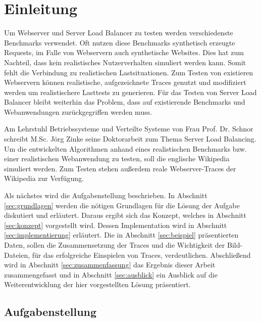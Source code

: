 \section{Einleitung}
\label{sec:einleitung}

Um Webserver und Server Load Balancer zu testen werden verschiedenste Benchmarks verwendet. Oft nutzen diese Benchmarks synthetisch erzeugte Requests, im Falle von Webservern auch synthetische Websites. Dies hat zum Nachteil, dass kein realistisches Nutzerverhalten simuliert werden kann. Somit fehlt die Verbindung zu realistischen Lastsituationen. Zum Testen von existieren Webservern können realistische, aufgezeichnete Traces genutzt und modifiziert werden um realistischere Lasttests zu generieren. Für das Testen von Server Load Balancer bleibt weiterhin das Problem, dass auf existierende Benchmarks und Webanwendungen zurückgegriffen werden muss. 

Am Lehrstuhl Betriebssysteme und Verteilte Systeme von Frau Prof. Dr. Schnor
schreibt M.Sc. Jörg Zinke seine Doktorarbeit zum Thema Server Load Balancing. Um die entwickelten Algorithmen anhand eines realistischen Benchmarks bzw. einer realistischen Webanwendung zu testen, soll die englische Wikipedia simuliert werden. Zum Testen stehen außerdem reale Webserver-Traces der Wikipedia zur Verfügung.

Als nächstes wird die Aufgabenstellung beschrieben. In Abschnitt \ref{sec:grundlagen} werden die nötigen Grundlagen für die Lösung der Aufgabe diskutiert und erläutert. Daraus ergibt sich das Konzept, welches in Abschnitt \ref{sec:konzept} vorgestellt wird. Dessen Implementation wird in Abschnitt \ref{sec:implementierung} erläutert. Die in Abschnitt \ref{sec:beispiel} präsentierten Daten, sollen die Zusammensetzung der Traces und die Wichtigkeit der Bild-Dateien, für das erfolgreiche Einspielen von Traces, verdeutlichen. Abschließend wird in Abschnitt \ref{sec:zusammenfassung} das Ergebnis dieser Arbeit zusammengefasst und in Abschnitt \ref{sec:ausblick} ein Ausblick auf die Weiterentwicklung der hier vorgestellten Lösung präsentiert.

\subsection{Aufgabenstellung}
\label{sec:aufgabestellung}


